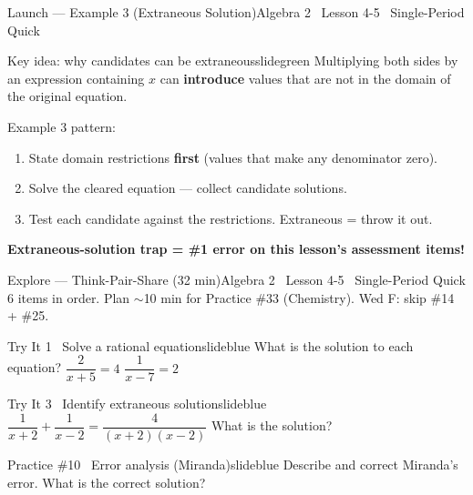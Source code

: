 \documentclass[aspectratio=169, 11pt]{beamer}
\begin{document}
\begin{frame}{Launch --- Example 3 (Extraneous Solution)}{Algebra 2 \textperiodcentered\ Lesson 4-5 \textperiodcentered\ Single-Period Quick}
\vspace{0.15cm}
\begin{projcard}{Key idea: why candidates can be extraneous}{slidegreen}
\small
Multiplying both sides by an expression containing \(x\) can \textbf{introduce} values that are not in the domain of the original equation.

\vspace{0.1cm}
Example 3 pattern:
\begin{enumerate}
  \setlength{\itemsep}{1pt}
  \item State domain restrictions \textbf{first} (values that make any denominator zero).
  \item Solve the cleared equation --- collect candidate solutions.
  \item Test each candidate against the restrictions. Extraneous = throw it out.
\end{enumerate}

\vspace{0.1cm}
\textcolor{slideaccent}{\textbf{Extraneous-solution trap = \#1 error on this lesson's assessment items!}}
\end{projcard}
\end{frame}

\begin{frame}{Explore --- Think-Pair-Share (32 min)}{Algebra 2 \textperiodcentered\ Lesson 4-5 \textperiodcentered\ Single-Period Quick}
\small\textcolor{slidegray}{6 items in order. Plan \(\sim\)10 min for Practice \#33 (Chemistry). Wed F: skip \#14 + \#25.}

\vspace{0.1cm}
\begin{projcard}{Try It 1 \textperiodcentered\ Solve a rational equation}{slideblue}
What is the solution to each equation? \quad
\(\dfrac{2}{x+5} = 4\) \quad \(\dfrac{1}{x-7} = 2\)
\end{projcard}
\vspace{-0.12cm}
\begin{projcard}{Try It 3 \textperiodcentered\ Identify extraneous solution}{slideblue}
\(\dfrac{1}{x+2} + \dfrac{1}{x-2} = \dfrac{4}{(x+2)(x-2)}\) \quad What is the solution?
\end{projcard}
\vspace{-0.12cm}
\begin{projcard}{Practice \#10 \textperiodcentered\ Error analysis (Miranda)}{slideblue}
Describe and correct Miranda's error. What is the correct solution?
\end{projcard}
\end{frame}
\end{document}
